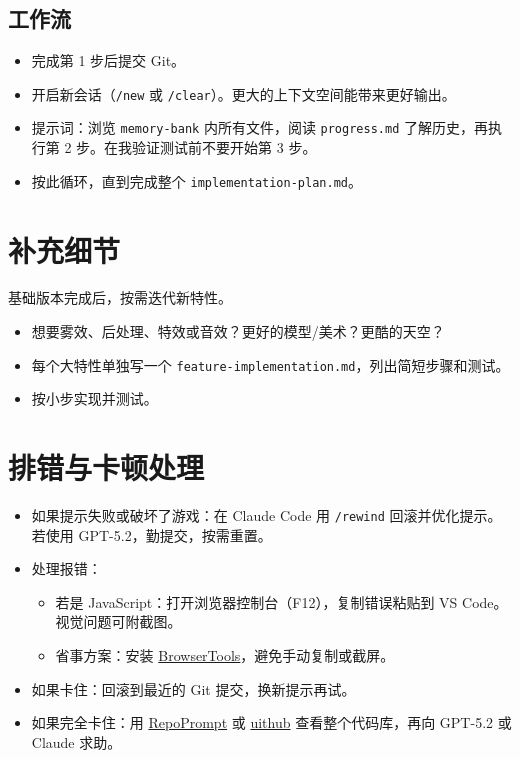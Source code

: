 \documentclass[12pt]{article}
\begin{document}
\subsection{工作流}
\begin{itemize}
  \item 完成第 1 步后提交 Git。
  \item 开启新会话（\texttt{/new} 或 \texttt{/clear}）。更大的上下文空间能带来更好输出。
  \item 提示词：浏览 \texttt{memory-bank} 内所有文件，阅读 \texttt{progress.md} 了解历史，再执行第 2 步。在我验证测试前不要开始第 3 步。
  \item 按此循环，直到完成整个 \texttt{implementation-plan.md}。
\end{itemize}

\section{补充细节}
基础版本完成后，按需迭代新特性。
\begin{itemize}
  \item 想要雾效、后处理、特效或音效？更好的模型/美术？更酷的天空？
  \item 每个大特性单独写一个 \texttt{feature-implementation.md}，列出简短步骤和测试。
  \item 按小步实现并测试。
\end{itemize}

\section{排错与卡顿处理}
\begin{itemize}
  \item 如果提示失败或破坏了游戏：在 Claude Code 用 \texttt{/rewind} 回滚并优化提示。若使用 GPT-5.2，勤提交，按需重置。
  \item 处理报错：
  \begin{itemize}
    \item 若是 JavaScript：打开浏览器控制台（F12），复制错误粘贴到 VS Code。视觉问题可附截图。
    \item 省事方案：安装 \href{https://browsertools.agentdesk.ai/installation}{BrowserTools}，避免手动复制或截屏。
  \end{itemize}
  \item 如果卡住：回滚到最近的 Git 提交，换新提示再试。
  \item 如果完全卡住：用 \href{https://repoprompt.com/}{RepoPrompt} 或 \href{https://uithub.com/}{uithub} 查看整个代码库，再向 GPT-5.2 或 Claude 求助。
\end{itemize}
\end{document}
